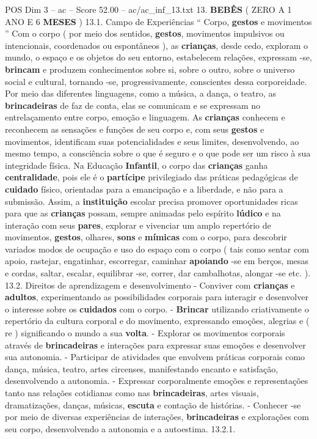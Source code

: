 \begin{textsample}{POS Dim 3 – ac – Score 52.00 – ac/ac\_inf\_13.txt}  \label{ex:f3_pos_024}
13. \textbf{BEBÊS} ( ZERO A 1 ANO E 6 \textbf{MESES} ) 13.1.
Campo de Experiências “ Corpo, \textbf{gestos} e movimentos ” Com o corpo ( por meio dos sentidos, \textbf{gestos}, movimentos impulsivos ou intencionais, coordenados ou espontâneos ), as \textbf{crianças}, desde cedo, exploram o mundo, o espaço e os objetos do seu entorno, estabelecem relações, expressam -se, \textbf{brincam} e produzem conhecimentos sobre si, sobre o outro, sobre o universo social e cultural, tornando -se, progressivamente, conscientes dessa corporeidade.
Por meio das diferentes linguagens, como a música, a dança, o teatro, as \textbf{brincadeiras} de faz de conta, elas se comunicam e se expressam no entrelaçamento entre corpo, emoção e linguagem.
As \textbf{crianças} conhecem e reconhecem as sensações e funções de seu corpo e, com seus \textbf{gestos} e movimentos, identificam suas potencialidades e seus limites, desenvolvendo, ao mesmo tempo, a consciência sobre o que é seguro e o que pode ser um risco à sua integridade física.
Na Educação \textbf{Infantil}, o corpo das \textbf{crianças} ganha \textbf{centralidade}, pois ele é o \textbf{partícipe} privilegiado das práticas pedagógicas de \textbf{cuidado} físico, orientadas para a emancipação e a liberdade, e não para a submissão.
Assim, a \textbf{instituição} escolar precisa promover oportunidades ricas para que as \textbf{crianças} possam, sempre animadas pelo espírito \textbf{lúdico} e na interação com seus \textbf{pares}, explorar e vivenciar um amplo repertório de movimentos, \textbf{gestos}, olhares, \textbf{sons} e \textbf{mímicas} com o corpo, para descobrir variados modos de ocupação e uso do espaço com o corpo ( tais como sentar com apoio, rastejar, engatinhar, escorregar, caminhar \textbf{apoiando} -se em berços, mesas e cordas, saltar, escalar, equilibrar -se, correr, dar cambalhotas, alongar -se etc. ). 13.2.
Direitos de aprendizagem e desenvolvimento - Conviver com \textbf{crianças} e \textbf{adultos}, experimentando as possibilidades corporais para interagir e desenvolver o interesse sobre os \textbf{cuidados} com o corpo. - \textbf{Brincar} utilizando criativamente o repertório da cultura corporal e do movimento, expressando emoções, alegrias e ( re ) significando o mundo a sua \textbf{volta}. - Explorar os movimentos corporais através de \textbf{brincadeiras} e interações para expressar suas emoções e desenvolver sua autonomia. - Participar de atividades que envolvem práticas corporais como dança, música, teatro, artes circenses, manifestando encanto e satisfação, desenvolvendo a autonomia. - Expressar corporalmente emoções e representações tanto nas relações cotidianas como nas \textbf{brincadeiras}, artes visuais, dramatizações, danças, músicas, \textbf{escuta} e contação de histórias. - Conhecer -se por meio de diversas experiências de interações, \textbf{brincadeiras} e explorações com seu corpo, desenvolvendo a autonomia e a autoestima. 13.2.1.

\end{textsample}
